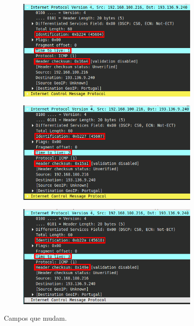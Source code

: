 \documentclass{llncs}
\begin{document}
\begin{figure}[h]
	\centering
	\begin{subfigure}{.4\textwidth}
		\centering
		\includegraphics[width=0.98\linewidth]{./imagens/icmp_TTL_1.png}
	\end{subfigure}%
	\begin{subfigure}{.4\textwidth}
		\centering
		\includegraphics[width=0.98\linewidth]{./imagens/icmp_TTL_2.png}
	\end{subfigure}%
	\begin{subfigure}{.4\textwidth}
		\centering
		\includegraphics[width=0.98\linewidth]{./imagens/icmp_TTL_3.png}
	\end{subfigure}
	\caption{Campos que mudam.}
	\label{fig:field_change}
\end{figure}
\end{document}
